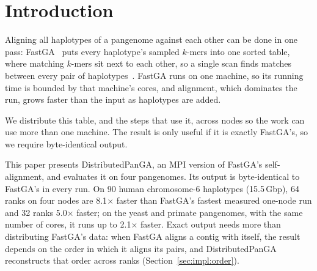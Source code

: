 \section{Introduction}\label{sec:introduction}

Aligning all haplotypes of a pangenome against each other can be done in
one pass: FastGA~\cite{fastga} puts every haplotype's sampled $k$-mers into
one sorted table, where matching $k$-mers sit next to each other, so a
single scan finds matches between every pair of
haplotypes~\cite{garrison}. FastGA runs on one machine, so its running time
is bounded by that machine's cores, and alignment, which dominates the run,
grows faster than the input as haplotypes are added.

We distribute this table, and the steps that use it, across nodes so the
work can use more than one machine. The result is only useful if it is exactly FastGA's,
so we require byte-identical output.

This paper presents DistributedPanGA, an MPI version of FastGA's
self-alignment, and evaluates it on four pangenomes. Its output is
byte-identical to FastGA's in every run. On 90 human chromosome-6
haplotypes (15.5\,Gbp), 64 ranks on four nodes are 8.1$\times$ faster than
FastGA's fastest measured one-node run and 32 ranks 5.0$\times$ faster; on
the yeast and primate pangenomes, with the same number of cores, it runs up
to 2.1$\times$ faster. Exact output needs more than distributing FastGA's
data: when FastGA aligns a contig with itself, the result depends on the
order in which it aligns its pairs, and DistributedPanGA reconstructs that
order across ranks (Section~\ref{sec:impl:order}).
